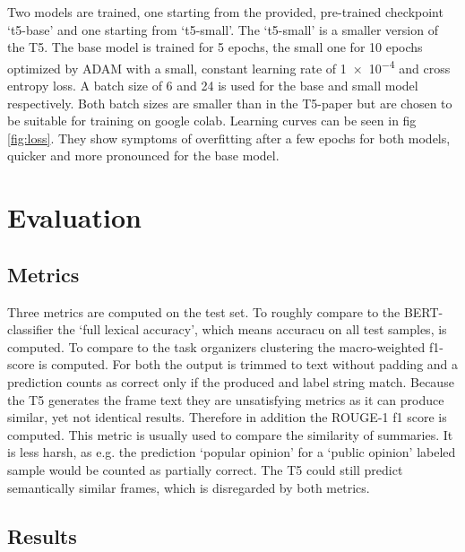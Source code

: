 \documentclass[11pt,a4paper,onecolumn,oneside,notitlepage]{article}
\begin{document}
Two models are trained, one starting from the provided, pre-trained checkpoint ‘t5-base’ and one starting from ‘t5-small’. The ‘t5-small’ is a smaller version of the T5. The base model is trained for \num{5} epochs, the small one for \num{10} epochs optimized by ADAM \citep{kingma2017adam} with a small, constant learning rate of \num{1e-4} and cross entropy loss. A batch size of 6 and 24 is used for the base and small model respectively. Both batch sizes are smaller than in the T5-paper but are chosen to be suitable for training on google colab. Learning curves can be seen in fig \ref{fig:loss}. They show symptoms of overfitting after a few epochs for both models, quicker and more pronounced for the base model.

\section{Evaluation}
\subsection{Metrics}
Three metrics are computed on the test set. To roughly compare to the BERT-classifier the ‘full lexical accuracy’, which means accuracu on all test samples, is computed. To compare to the task organizers clustering the macro-weighted f1-score is computed. For both the output is trimmed to text without padding and a prediction counts as correct only if the produced and label string match. Because the T5 generates the frame text they are unsatisfying metrics as it can produce similar, yet not identical results. Therefore in addition the ROUGE-1 f1 \citep{rouge} score is computed. This metric is usually used to compare the similarity of summaries. It is less harsh, as e.g. the prediction ‘popular opinion’ for a ‘public opinion’ labeled sample would be counted as partially correct. The T5 could still predict semantically similar frames, which is disregarded by both metrics.

\subsection{Results}
\end{document}
